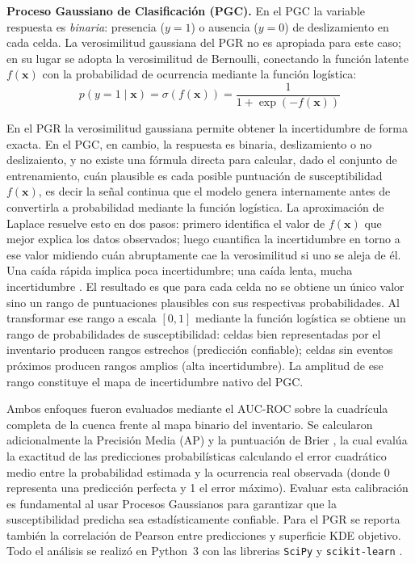 \documentclass[letterpaper,11pt]{tec}
\begin{document}
{\textbf{Proceso Gaussiano de Clasificación (PGC).} En el PGC la variable respuesta es
\textit{binaria}: presencia ($y=1$) o ausencia ($y=0$) de deslizamiento en cada celda. La verosimilitud
gaussiana del PGR no es apropiada para este caso; en su lugar se adopta la verosimilitud de Bernoulli,
conectando la función latente $f(\mathbf{x})$ con la probabilidad de ocurrencia mediante la función logística:
\begin{equation}
    p(y=1\mid\mathbf{x}) = \sigma\!\left(f(\mathbf{x})\right) = \frac{1}{1 + \exp\!\left(-f(\mathbf{x})\right)}
    \label{eq:gpc}
\end{equation}

En el PGR la verosimilitud gaussiana permite obtener la incertidumbre de forma exacta.
En el PGC, en cambio, la respuesta es binaria, deslizamiento o no deslizaiento, y no existe
una fórmula directa para calcular, dado el conjunto de entrenamiento, cuán plausible es
cada posible puntuación de susceptibilidad $f(\mathbf{x})$, es decir la señal continua que el modelo
genera internamente antes de convertirla a probabilidad mediante la función logística.
La aproximación de Laplace resuelve esto en dos pasos: primero identifica el valor de
$f(\mathbf{x})$ que mejor explica los datos observados; luego cuantifica la incertidumbre
en torno a ese valor midiendo cuán abruptamente cae la verosimilitud si uno se aleja de
él. Una caída rápida implica poca incertidumbre; una caída lenta, mucha incertidumbre \citep{Rasmussen2006}.
El resultado es que para cada celda no se obtiene un único valor sino un rango de
puntuaciones plausibles con sus respectivas probabilidades. Al transformar ese rango a
escala $[0,1]$ mediante la función logística se obtiene un rango de probabilidades
de susceptibilidad: celdas bien representadas por el inventario producen rangos estrechos
(predicción confiable); celdas sin eventos próximos producen rangos amplios (alta
incertidumbre). La amplitud de ese rango constituye el mapa de incertidumbre nativo del PGC.

Ambos enfoques fueron evaluados mediante el AUC-ROC \citep{Fawcett2006} sobre la cuadrícula completa de la cuenca frente al mapa
binario del inventario. Se calcularon adicionalmente la Precisión Media (AP) y la puntuación de Brier \citep{Brier1950}, 
la cual evalúa la exactitud de las predicciones probabilísticas calculando el error cuadrático medio entre la probabilidad estimada 
y la ocurrencia real observada (donde 0 representa una predicción perfecta y 1 el error máximo). Evaluar esta calibración es fundamental 
al usar Procesos Gaussianos para garantizar que la susceptibilidad predicha sea estadísticamente confiable. Para el
PGR se reporta también la correlación de Pearson entre predicciones y superficie KDE objetivo. Todo el análisis se realizó en 
Python~3 con las librerias \texttt{SciPy} y \texttt{scikit-learn} \citep{Pedregosa2011}.

}
\end{document}
